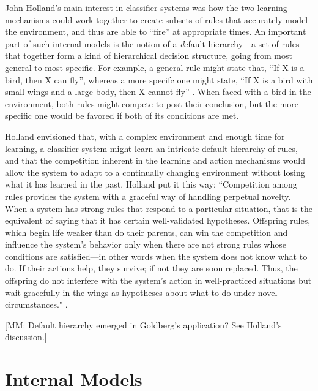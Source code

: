 \documentclass{sig-alternate}
\begin{document}
John Holland's main interest in classifier systems was how the two
learning mechanisms could work together to create subsets of rules
that accurately model the environment, and thus are able to ``fire''
at appropriate times.  An important part of such internal models is
the notion of a {\emph default hierarchy}---a set of rules that
together form a kind of hierarchical decision structure, going from
most general to most specific.  For example, a general rule might
state that, ``If X is a bird, then X can fly'', whereas a more specifc
one might state, ``If X is a bird with small wings and a large body,
then X cannot fly'' \cite{InductionBook}.  When faced with a bird in
the environment, both rules might compete to post their conclusion,
but the more specific one would be favored if both of its conditions are met.

Holland envisioned that, with a complex environment and enough time
for learning, a classifier system might learn an intricate default
hierarchy of rules, and that the competition inherent in the learning
and action mechanisms would allow the system to adapt to a continually
changing environment without losing what it has learned in the past.
Holland put it this way: ``Competition among rules provides the system
with a graceful way of handling perpetual novelty.  When a system has
strong rules that respond to a particular situation, that is the
equivalent of saying that it has certain well-validated hypotheses.
Offspring rules, which begin life weaker than do their parents, can
win the competition and influence the system's behavior only when
there are not strong rules whose conditions are satisfied---in other
words when the system does not know what to do.  If their actions
help, they survive; if not they are soon replaced.  Thus, the
offspring do not interfere with the system's action in well-practiced
situations but wait gracefully in the wings as hypotheses about what
to do under novel circumstances." \cite{HollandSciAmArticle}.

[MM: Default hierarchy emerged in Goldberg's application?  See Holland's discussion.]

\section{Internal Models}
\end{document}
